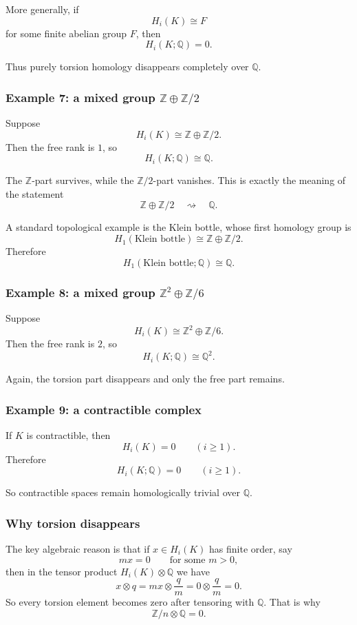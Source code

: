 \documentclass[12pt,a4paper]{article}
\theoremstyle{notespace}
\begin{document}
More generally, if
\[
H_i(K)\cong F
\]
for some finite abelian group \(F\), then
\[
H_i(K;\mathbb Q)=0.
\]

Thus purely torsion homology disappears completely over \(\mathbb Q\).

\subsubsection*{Example 7: a mixed group \(\mathbb Z\oplus \mathbb Z/2\)}

Suppose
\[
H_i(K)\cong \mathbb Z\oplus \mathbb Z/2.
\]
Then the free rank is \(1\), so
\[
H_i(K;\mathbb Q)\cong \mathbb Q.
\]

The \(\mathbb Z\)-part survives, while the \(\mathbb Z/2\)-part vanishes. This is exactly the meaning of the statement
\[
\mathbb Z\oplus \mathbb Z/2 \quad \rightsquigarrow \quad \mathbb Q.
\]

A standard topological example is the Klein bottle, whose first homology group is
\[
H_1(\text{Klein bottle})\cong \mathbb Z\oplus \mathbb Z/2.
\]
Therefore
\[
H_1(\text{Klein bottle};\mathbb Q)\cong \mathbb Q.
\]

\subsubsection*{Example 8: a mixed group \(\mathbb Z^2\oplus \mathbb Z/6\)}

Suppose
\[
H_i(K)\cong \mathbb Z^2\oplus \mathbb Z/6.
\]
Then the free rank is \(2\), so
\[
H_i(K;\mathbb Q)\cong \mathbb Q^2.
\]

Again, the torsion part disappears and only the free part remains.

\subsubsection*{Example 9: a contractible complex}

If \(K\) is contractible, then
\[
H_i(K)=0
\qquad
(i\ge 1).
\]
Therefore
\[
H_i(K;\mathbb Q)=0
\qquad
(i\ge 1).
\]

So contractible spaces remain homologically trivial over \(\mathbb Q\).

\subsubsection*{Why torsion disappears}

The key algebraic reason is that if \(x\in H_i(K)\) has finite order, say
\[
mx=0
\qquad
\text{for some }m>0,
\]
then in the tensor product \(H_i(K)\otimes \mathbb Q\) we have
\[
x\otimes q
=
mx\otimes \frac{q}{m}
=
0\otimes \frac{q}{m}
=
0.
\]
So every torsion element becomes zero after tensoring with \(\mathbb Q\). That is why
\[
\mathbb Z/n\otimes \mathbb Q=0.
\]
\end{document}
